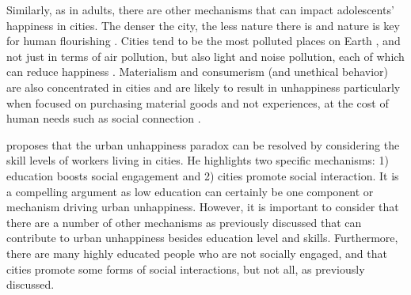 \documentclass[11pt, letterpaper]{article}
\begin{document}
\begin{spacing}{1.9}
Similarly, as in adults,  there are other mechanisms that can impact
adolescents' happiness in cities. The denser the city, the less nature there is 
\citep{aokCityBook15} and nature is key for human flourishing \citep{pretty12}. Cities tend to be the most polluted places on Earth %
\citep{meyer13}, and not just in terms of air pollution, but also light and
noise pollution, each of which can reduce happiness \citep{signoretta19,poonCL18jan29,leeTT16feb13,metcalfeCL16jun10,weinhold12,rehdanz08,welsch05,york03}. Materialism and consumerism (and unethical behavior) are also concentrated in cities \citep[e.g.,][]{aok-sizeFetish17,okulicz2022materialism,morris21,wirth38} and
 are likely to result in unhappiness particularly when focused on purchasing
 material goods and not experiences,  at the cost of human needs such as social connection
 \citep[e.g.,][]{frank12,leonard10,vanboven05,burroughs02,dumludag21}.%
  

%
\citet{morrison2024resolving} proposes that the urban unhappiness  paradox can be resolved by considering the skill levels of workers living in cities. He highlights two
specific mechanisms: 1) education boosts social engagement and 2) cities promote
social interaction. It is a compelling argument as low education can certainly be
one component or mechanism driving urban unhappiness. However, it is important
to consider that there are a number of other mechanisms as previously discussed
that can contribute to urban unhappiness besides education level and
skills. Furthermore, there are many highly educated people who are not socially engaged, and that cities promote some forms of social
interactions, but not all, as previously discussed.

 

\end{spacing}
\end{document}
